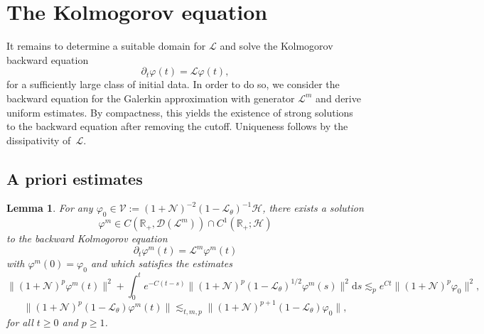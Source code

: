 \documentclass{article}
\newcommand{\assign}{:=}
\newcommand{\mathd}{\mathrm{d}}
\newtheorem{lemma}{Lemma}
\begin{document}
\section{The Kolmogorov equation}\label{s:kolmogorov}

It remains to determine a suitable domain for $\mathcal{L}$ and solve the
Kolmogorov backward equation
\[ \partial_t \varphi (t) =\mathcal{L} \varphi (t), \]
for a sufficiently large class of initial data. In order to do so, we consider
the backward equation for the Galerkin approximation with generator
$\mathcal{L}^m$ and derive uniform estimates. By compactness, this yields the
existence of strong solutions to the backward equation after removing the
cutoff. Uniqueness follows by the dissipativity of~$\mathcal{L}$.

\subsection{A priori estimates }\label{s:a-priori-bounds}

\begin{lemma}
  For any $\varphi_0 \in \mathcal{V} \assign (1 +\mathcal{N})^{- 2} (1
  -\mathcal{L}_{\theta})^{- 1} \mathcal{H}$, there exists a solution
  \[ \varphi^m \in C (\mathbb{R}_+, \mathcal{D} (\mathcal{L}^m)) \cap C^1
     (\mathbb{R}_+ ; \mathcal{H}) \]
  to the backward Kolmogorov equation
  \[ \partial_t \varphi^m (t) =\mathcal{L}^m \varphi^m (t) \]
  with $\varphi^m (0) = \varphi_0$ and which satisfies the estimates
  \[ \| (1 +\mathcal{N})^p \varphi^m (t) \|^2 + \int_0^t e^{- C (t - s)} \| (1
     +\mathcal{N})^p (1 -\mathcal{L}_{\theta})^{1 / 2} \varphi^m (s) \|^2
     \mathd s \lesssim_p e^{C t} \| (1 +\mathcal{N})^p \varphi_0 \|^2, \]
  \[ \| (1 +\mathcal{N})^p (1 -\mathcal{L}_{\theta}) \varphi^m (t) \|
     \lesssim_{t, m, p} \| (1 +\mathcal{N})^{p + 1} (1 -\mathcal{L}_{\theta})
     \varphi_0 \|, \]
  for all $t \geqslant 0$ and $p \geqslant 1$.
\end{lemma}
\end{document}
